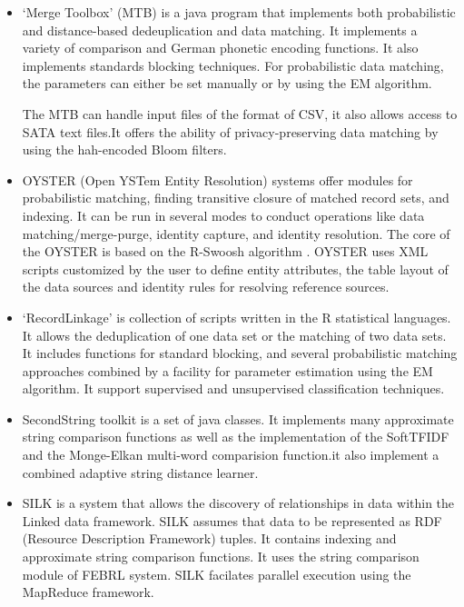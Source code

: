 \begin{itemize}
FRIL supports parallelization on multi-core systems in a way that is transparent to the user, that is if FRIL detects multi-core systems then it will run algorithms in parallel.

\item ‘Merge Toolbox’ (MTB)\cite{SBBe04} is a java program that implements both probabilistic and distance-based dedeuplication and data matching. It implements a variety of comparison and German phonetic encoding functions. It also implements standards blocking techniques. For probabilistic data matching, the parameters can either be set manually or by using the EM algorithm.

The MTB can handle input files of the format of CSV, it also allows access to SATA text files.It offers the ability of privacy-preserving data matching by using the hah-encoded Bloom filters.

\item OYSTER (Open YSTem Entity Resolution)\cite{Talb11} systems offer modules for probabilistic matching, finding transitive closure of matched record sets, and indexing. It can be run in several modes to conduct operations like data matching/merge-purge, identity capture, and identity resolution. The core of the OYSTER is based on the R-Swoosh algorithm .
OYSTER uses XML scripts customized by  the user to define entity attributes, the table layout of the data sources and identity rules for resolving reference sources.


\item ‘RecordLinkage’ \cite{SaBo10} is collection of scripts written in the R statistical languages. It allows the deduplication of one data set or the matching of two data sets. It includes functions for standard blocking, and several probabilistic matching approaches combined by a facility for parameter estimation using the EM algorithm. It support supervised and unsupervised classification techniques.

\item SecondString toolkit\cite{CRFi03} is a set of java classes. It implements many approximate string comparison functions as well as the implementation of the SoftTFIDF and the Monge-Elkan multi-word comparision function.it also implement a combined adaptive string distance learner.

\item SILK\cite{JIBi10} is a system that allows the discovery of relationships in data within the Linked data framework. SILK assumes that data to be represented as RDF (Resource Description Framework) tuples. It contains indexing and approximate string comparison functions. It uses the string comparison module of FEBRL system. SILK facilates parallel execution using the MapReduce framework.


\end{itemize}

